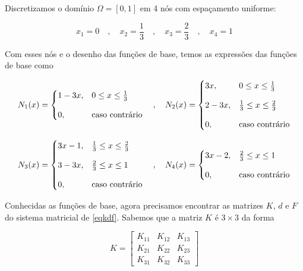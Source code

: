 \documentclass[12pt]{scrartcl}
\begin{document}
Discretizamos o domínio $\Omega = \left[0, 1\right]$ em 4 nós com espaçamento uniforme:

\[
    x_1 = 0 \quad , \quad x_2 = \frac{1}{3} \quad , \quad x_3 = \frac{2}{3} \quad , \quad x_4 = 1
\]

Com esses nós e o desenho das funções de base, temos as expressões das funções de base como

\[
    N_1(x) = \begin{cases}
        1 - 3x, & 0 \leq x \leq \frac{1}{3} \\
        \noalign{\vskip9pt}
        0,      & \textrm{caso contrário}
    \end{cases}
    \quad , \quad
    N_2(x) = \begin{cases}
        3x,     & 0 \leq x \leq \frac{1}{3}           \\
        \noalign{\vskip9pt}
        2 - 3x, & \frac{1}{3} \leq x \leq \frac{2}{3} \\
        \noalign{\vskip9pt}
        0,      & \textrm{caso contrário}
    \end{cases}
\]

\[
    N_3(x) = \begin{cases}
        3x - 1, & \frac{1}{3} \leq x \leq \frac{2}{3} \\
        \noalign{\vskip9pt}
        3 - 3x, & \frac{2}{3} \leq x \leq 1           \\
        \noalign{\vskip9pt}
        0,      & \textrm{caso contrário}
    \end{cases}
    \quad , \quad
    N_4(x) = \begin{cases}
        3x - 2, & \frac{2}{3} \leq x \leq 1 \\
        \noalign{\vskip9pt}
        0,      & \textrm{caso contrário}
    \end{cases}
\]

Conhecidas as funções de base, agora precisamos encontrar as matrizes $K$, $d$ e $F$ do sistema matricial de \eqref{eqkdf}. 
Sabemos que a matriz $K$ é $3 \times 3$ da forma

\begingroup
\renewcommand*{\arraystretch}{2}

\[
    K =
    \begin{bmatrix}
        K_{11} & K_{12} & K_{13} \\
        K_{21} & K_{22} & K_{23} \\
        K_{31} & K_{32} & K_{33}
    \end{bmatrix}
\]

\endgroup
\end{document}
